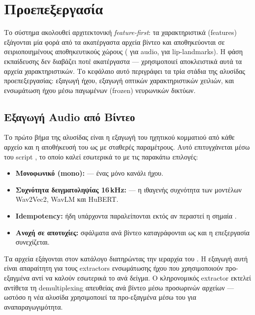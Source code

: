\chapter{Προεπεξεργασία}

Το σύστημα ακολουθεί αρχιτεκτονική \emph{feature-first}: τα χαρακτηριστικά
(features) εξάγονται μία φορά από τα ακατέργαστα αρχεία βίντεο και αποθηκεύονται
σε σειριοποιημένους αποθηκευτικούς χώρους ( για audio,
 για lip-landmarks).
Η φάση εκπαίδευσης δεν διαβάζει ποτέ ακατέργαστα 
— χρησιμοποιεί αποκλειστικά αυτά τα αρχεία χαρακτηριστικών.
Το κεφάλαιο αυτό περιγράφει τα τρία στάδια της αλυσίδας προεπεξεργασίας:
εξαγωγή ήχου, εξαγωγή οπτικών χαρακτηριστικών χειλιών, και
ενσωμάτωση ήχου μέσω παγωμένων (frozen) νευρωνικών δικτύων.

\section{Εξαγωγή Audio από Βίντεο}
\label{sec:export-wav}

Το πρώτο βήμα της αλυσίδας είναι η εξαγωγή του ηχητικού κομματιού από κάθε
αρχείο  και η αποθήκευσή του ως  με σταθερές
παραμέτρους.
Αυτό επιτυγχάνεται μέσω του script , το οποίο
καλεί εσωτερικά το  με τις παρακάτω επιλογές:

\begin{itemize}
  \item \textbf{Μονοφωνικό (mono):}  — ένας μόνο κανάλι ήχου.
  \item \textbf{Συχνότητα δειγματοληψίας 16\,kHz:}  — η
    ιθαγενής συχνότητα των μοντέλων Wav2Vec2, WavLM και HuBERT.
  \item \textbf{Idempotency:} ήδη υπάρχοντα  παραλείπονται
    εκτός αν περαστεί η σημαία .
  \item \textbf{Ανοχή σε αποτυχίες:} σφάλματα ανά βίντεο καταγράφονται ως
     και η επεξεργασία συνεχίζεται.
\end{itemize}

Τα αρχεία  εξάγονται στον κατάλογο 
διατηρώντας την ιεραρχία του .
Η εξαγωγή αυτή είναι απαραίτητη για τους extractors ενσωμάτωσης ήχου που
χρησιμοποιούν προ-εξαγμένα  αντί να καλούν εσωτερικά το
 ανά δείγμα.
Ο κληρονομικός extractor  εκτελεί
αντίθετα τη demultiplexing απευθείας ανά βίντεο μέσω προσωρινών αρχείων —
ωστόσο η νέα αλυσίδα χρησιμοποιεί τα προ-εξαγμένα  μέσω
του  για αναπαραγωγιμότητα.

